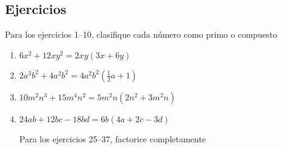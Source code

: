 \documentclass[10pt,twoside]{article}
\begin{document}
\subsection*{Ejercicios}
Para los ejercicios 1--10, clasifique cada número como primo o compuesto
\begin{enumerate}
Para los problemas 11--20, factorice cada número compuesto como producto de números primos. Por ejemplo, $30=2\cdot 3 \cdot 5$
Para los problemas 21--24, determine si el polinomio está completamente factorizado
\item $6x^{2}+12xy^{2}=2xy(3x+6y)$
\item $2a^{3}b^{2}+4a^{2}b^{2}=4a^{2}b^{2}\left(\frac{1}{2}a+1\right)$
\item $10m^{2}n^{3}+15m^{4}n^{2}=5m^{2}n(2n^{2}+3m^{2}n)$
\item $24ab+12bc-18bd=6b(4a+2c-3d)$

Para los ejercicios 25--37, factorice completamente


\end{enumerate}
\end{document}

